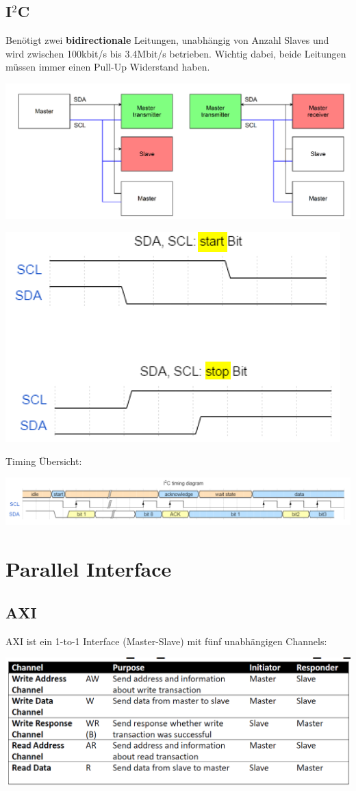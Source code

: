 \subsection{I$^2$C}
Benötigt zwei \textbf{bidirectionale} Leitungen, unabhängig von Anzahl Slaves und wird zwischen 100kbit/s bis 3.4Mbit/s betrieben. Wichtig dabei, beide Leitungen müssen immer einen Pull-Up Widerstand haben.
\begin{center}
	\includegraphics[width=0.7\columnwidth]{Images/i2c}
\end{center}
\begin{center}
	\includegraphics[width=0.7\columnwidth]{Images/i2c_start}
\end{center}

Timing Übersicht:
\begin{center}
	\includegraphics[width=\columnwidth]{Images/i2c_timing}
\end{center}

\section{Parallel Interface}
\subsection{AXI}
AXI ist ein 1-to-1 Interface (Master-Slave) mit fünf unabhängigen Channels:
\begin{center}
	\includegraphics[width=\columnwidth]{Images/axi}
\end{center}

